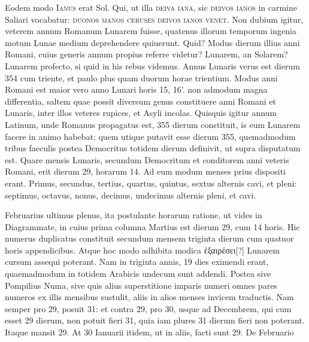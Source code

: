 Eodem
modo \textsc{Ianus} erat Sol.
%
Qui, ut illa \textsc{deiva iana}, sic \textsc{deivos
ianos} in carmine Saliari vocabatur: \textsc{duonos manos ceruses
deivos ianos venet}.
Non dubium igitur, veterem
annum Romanum Lunarem fuisse, quatenus illorum temporum ingenia
motum Lunae medium deprehendere quiuerunt.
Quid?
Modus
dierum illius anni Romani, cuius generis annum propius referre
videtur?
Lunarem, an Solarem?
Lunarem profecto, si quid in his
rebus videmus.
Annus Lunaris verus est dierum 354 cum triente,
et paulo plus quam duorum horae trientium.
Modus anni Romani
est maior vero anno Lunari horis 15, 16'. %
non admodum magna differentia,
saltem quae possit diversum genus constituere anni Romani
et Lunaris, inter illos veteres rupices, et Asyli incolas.
Quisquis igitur
annum Latinum, unde Romanus propagatus est, 355 dierum
constituit, is eum Lunarem facere in animo habebat; quem utique
putavit esse dierum 355, quemadmodum tribus faeculis postea Democritus
totidem dierum definivit, ut supra disputatum est.
Quare
mensis Lunaris, secundum Democritum et conditorem anni veteris
Romani, erit dierum 29, horarum 14.
Ad eum modum menses
prius dispositi erant.
Primus, secundus, tertius, quartus, quintus,
sextus alternis cavi, et pleni: septimus, octavus, nonus, decimus,
undecimus alternis pleni, et cavi.
\begin{table}[tb]
  
\end{table}
%
Februarius ultimus plenus,
ita postulante horarum
ratione, ut vides in
Diagrammate, in cuius
prima columna Martius
est dierum 29, cum 14 horis.
Hic numerus duplicatus
constituit secundum
mensem triginta dierum
cum quatuor horis
appendicibus.
Atque hoc
modo adhibita modica
\textgreek{ἐξαιρέσει[?]} Lunarem cursum
assequi poterant.
Nam in
triginta annis, 19 dies eximendi erant, quaemadmodum in totidem
Arabicis undecum sunt addendi.
Postea sive Pompilius
Numa, sive quis alius superstitione imparis numeri omnes pares
numeros ex illis mensibus sustulit, aliis in alios menses invicem
traductis.
Nam semper pro 29, posuit 31: et contra 29,
pro 30, usque ad Decembrem, qui cum esset 29 dierum, non
potuit fieri 31, quia iam plures 31 dierum fieri non poterant.
Itaque
mansit 29.
%
At 30 Ianuarii itidem, ut in aliis, facti sunt 29.
De Februario
